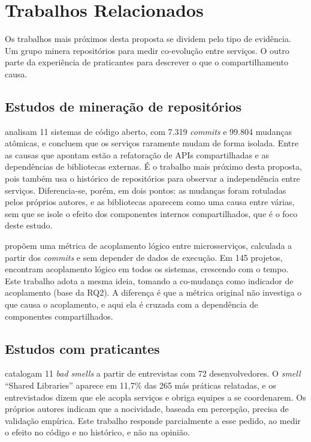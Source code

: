 \chapter{Trabalhos Relacionados}
\label{cap:trabalhos-relacionados}

Os trabalhos mais próximos desta proposta se dividem pelo tipo de evidência. Um grupo minera repositórios para medir co-evolução entre serviços. O outro parte da experiência de praticantes para descrever o que o compartilhamento causa.

\section{Estudos de mineração de repositórios}
\label{sec:mineracao}

 analisam 11 sistemas de código aberto, com 7.319 \textit{commits} e 99.804 mudanças atômicas, e concluem que os serviços raramente mudam de forma isolada. Entre as causas que apontam estão a refatoração de APIs compartilhadas e as dependências de bibliotecas externas. É o trabalho mais próximo desta proposta, pois também usa o histórico de repositórios para observar a independência entre serviços. Diferencia-se, porém, em dois pontos: as mudanças foram rotuladas pelos próprios autores, e as bibliotecas aparecem como uma causa entre várias, sem que se isole o efeito dos componentes internos compartilhados, que é o foco deste estudo.

 propõem uma métrica de acoplamento lógico entre microsserviços, calculada a partir dos \textit{commits} e sem depender de dados de execução. Em 145 projetos, encontram acoplamento lógico em todos os sistemas, crescendo com o tempo. Este trabalho adota a mesma ideia, tomando a co-mudança como indicador de acoplamento (base da RQ2). A diferença é que a métrica original não investiga o que causa o acoplamento, e aqui ela é cruzada com a dependência de componentes compartilhados.

\section{Estudos com praticantes}
\label{sec:praticantes}

 catalogam 11 \textit{bad smells} a partir de entrevistas com 72 desenvolvedores. O \textit{smell} ``Shared Libraries'' aparece em 11,7\% das 265 más práticas relatadas, e os entrevistados dizem que ele acopla serviços e obriga equipes a se coordenarem. Os próprios autores indicam que a nocividade, baseada em percepção, precisa de validação empírica. Este trabalho responde parcialmente a esse pedido, ao medir o efeito no código e no histórico, e não na opinião.

